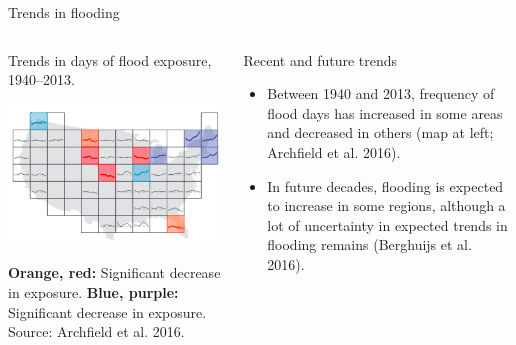 \documentclass[ignorenonframetext,]{beamer}
\begin{document}
\begin{frame}{Trends in flooding}

\begin{columns}

\begin{column}{0.6\textwidth}
\footnotesize Trends in days of flood exposure, 1940--2013.
\vspace{-0.3cm}

\begin{center}\includegraphics[width=\textwidth]{flood_trends} \end{center}
\vspace{-0.1cm}
\scriptsize \textbf{Orange, red:} Significant decrease in exposure. \textbf{Blue, purple:} Significant decrease in exposure. 
\vspace{0.1cm}
Source: Archfield et al. 2016.
\end{column}

\begin{column}{0.4\textwidth}
\begin{block}{Recent and future trends}
\small
\begin{itemize}
  \item Between 1940 and 2013, frequency of flood days has increased in some areas and decreased in others (map at left; Archfield et al. 2016).
  \item In future decades, flooding is expected to increase in some regions, although a lot of uncertainty in expected trends in flooding remains (Berghuijs et al. 2016).
\end{itemize}
\end{block}
\end{column}

\end{columns}

\end{frame}
\end{document}
